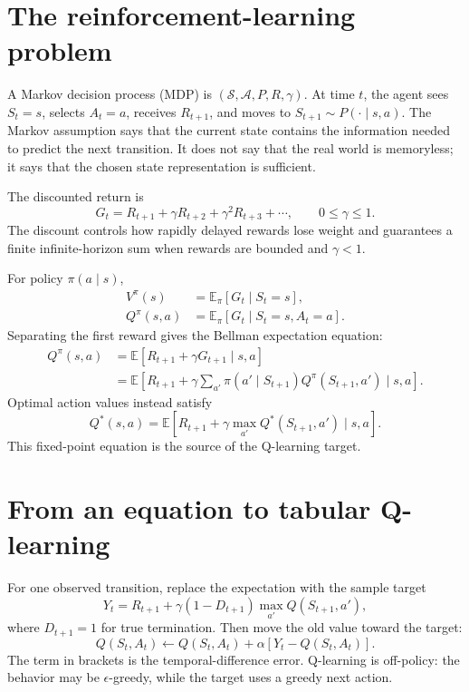 \documentclass[11pt]{article}
\newcommand{\E}{\mathbb E}
\begin{document}
\section{The reinforcement-learning problem}

A Markov decision process (MDP) is $(\mathcal S,\mathcal A,P,R,\gamma)$.
At time $t$, the agent sees $S_t=s$, selects $A_t=a$, receives $R_{t+1}$,
and moves to $S_{t+1}\sim P(\cdot\mid s,a)$. The Markov assumption says that
the current state contains the information needed to predict the next transition.
It does not say that the real world is memoryless; it says that the chosen state
representation is sufficient.

The discounted return is
\begin{equation}
G_t=R_{t+1}+\gamma R_{t+2}+\gamma^2R_{t+3}+\cdots,
\qquad 0\leq\gamma\leq1.
\end{equation}
The discount controls how rapidly delayed rewards lose weight and guarantees a
finite infinite-horizon sum when rewards are bounded and $\gamma<1$.

For policy $\pi(a\mid s)$,
\begin{align}
V^\pi(s)&=\E_\pi[G_t\mid S_t=s],\\
Q^\pi(s,a)&=\E_\pi[G_t\mid S_t=s,A_t=a].
\end{align}
Separating the first reward gives the Bellman expectation equation:
\begin{align}
Q^\pi(s,a)
&=\E\left[R_{t+1}+\gamma G_{t+1}\mid s,a\right]\\
&=\E\left[R_{t+1}+\gamma
\sum_{a'}\pi(a'\mid S_{t+1})Q^\pi(S_{t+1},a')\mid s,a\right].
\end{align}
Optimal action values instead satisfy
\begin{equation}
Q^*(s,a)=\E\left[R_{t+1}+\gamma\max_{a'}Q^*(S_{t+1},a')\mid s,a\right].
\end{equation}
This fixed-point equation is the source of the Q-learning target.

\section{From an equation to tabular Q-learning}

For one observed transition, replace the expectation with the sample target
\begin{equation}
Y_t=R_{t+1}+\gamma(1-D_{t+1})\max_{a'}Q(S_{t+1},a'),
\end{equation}
where $D_{t+1}=1$ for true termination. Then move the old value toward the target:
\begin{equation}
Q(S_t,A_t)\leftarrow Q(S_t,A_t)+\alpha\left[Y_t-Q(S_t,A_t)\right].
\end{equation}
The term in brackets is the temporal-difference error. Q-learning is off-policy:
the behavior may be $\epsilon$-greedy, while the target uses a greedy next action.
\end{document}
